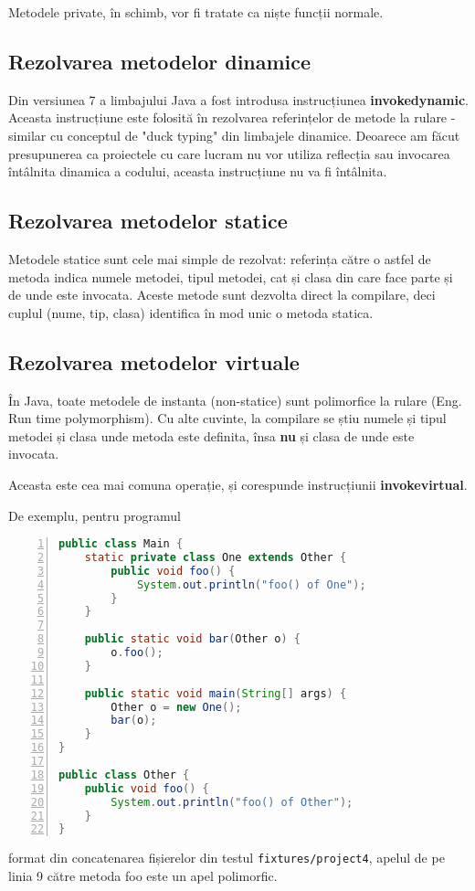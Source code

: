 Metodele private, în schimb, vor fi tratate ca niște funcții normale.

\subsection{Rezolvarea metodelor dinamice}

Din versiunea 7 a limbajului Java a fost introdusa instrucțiunea
\textbf{invokedynamic}.
Aceasta instrucțiune este folosită în rezolvarea referințelor de metode la
rulare - similar cu conceptul de "duck typing" din limbajele dinamice.
Deoarece am făcut presupunerea ca proiectele cu care lucram nu vor utiliza
reflecția sau invocarea întâlnita dinamica a codului, aceasta instrucțiune nu va
fi întâlnita.

\subsection{Rezolvarea metodelor statice}

Metodele statice sunt cele mai simple de rezolvat: referința către o astfel de
metoda indica numele metodei, tipul metodei, cat și clasa din care face parte și
de unde este invocata.
Aceste metode sunt dezvolta direct la compilare, deci cuplul (nume, tip, clasa)
identifica în mod unic o metoda statica.

\subsection{Rezolvarea metodelor virtuale}

În Java, toate metodele de instanta (non-statice) sunt polimorfice la rulare
(Eng. Run time polymorphism).
Cu alte cuvinte, la compilare se știu numele și tipul metodei și clasa unde
metoda este definita, însa \textbf{nu} și clasa de unde este invocata.

Aceasta este cea mai comuna operație, și corespunde instrucțiunii
\textbf{invokevirtual}.

De exemplu, pentru programul
\begin{lstlisting}[language=Java, numbers=left, label=program_metode_virtuale]
public class Main {
    static private class One extends Other {
        public void foo() {
            System.out.println("foo() of One");
        }
    }

    public static void bar(Other o) {
        o.foo();
    }

    public static void main(String[] args) {
        Other o = new One();
        bar(o);
    }
}

public class Other {
    public void foo() {
        System.out.println("foo() of Other");
    }
}
\end{lstlisting}
format din concatenarea fișierelor din testul \texttt{fixtures/project4},
apelul de pe linia 9 către metoda foo este un apel polimorfic.

